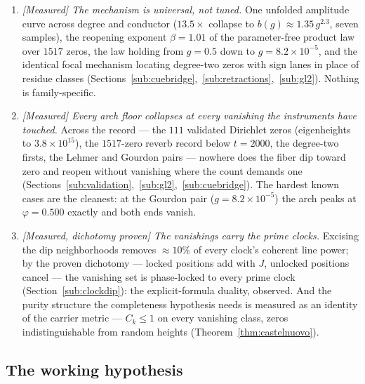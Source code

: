 \documentclass[11pt]{article}
\begin{document}
\begin{enumerate}[label=\textup{(\roman*)}]
\item \emph{[Measured] The mechanism is universal, not tuned.}  One unfolded amplitude curve
across degree and conductor ($13.5\times$ collapse to $b(g)\approx1.35\,g^{2.3}$, seven
samples), the reopening exponent $\beta=1.01$ of the parameter-free product law over $1517$
zeros, the law holding from $g=0.5$ down to $g=8.2\times10^{-5}$, and the identical focal
mechanism locating degree-two zeros with sign lanes in place of residue classes
(Sections~\ref{sub:cuebridge},~\ref{sub:retractions},~\ref{sub:gl2}).  Nothing is
family-specific.

\item \emph{[Measured] Every arch floor collapses at every vanishing the instruments have
touched.}  Across the record --- the $111$ validated Dirichlet zeros (eigenheights to
$3.8\times10^{15}$), the $1517$-zero reverb record below $t=2000$, the degree-two firsts, the
Lehmer and Gourdon pairs --- nowhere does the fiber dip toward zero and reopen without
vanishing where the count demands one
(Sections~\ref{sub:validation},~\ref{sub:gl2},~\ref{sub:cuebridge}).  The hardest known
cases are the cleanest: at the Gourdon pair ($g=8.2\times10^{-5}$) the arch peaks at
$\varphi=0.500$ exactly and both ends vanish.

\item \emph{[Measured, dichotomy proven] The vanishings carry the prime clocks.}  Excising the
dip neighborhoods removes ${\approx}10\%$ of every clock's coherent line power; by the proven
dichotomy --- locked positions add with $J$, unlocked positions cancel --- the vanishing set is
phase-locked to every prime clock (Section~\ref{sub:clockdip}): the explicit-formula duality,
observed.  And the purity structure the completeness hypothesis needs is measured as an identity
of the carrier metric --- $C_k\le1$ on every vanishing class, zeros indistinguishable from random
heights (Theorem~\ref{thm:castelnuovo}).
\end{enumerate}

\subsection{The working hypothesis}\label{sub:workinghyp}
\end{document}
